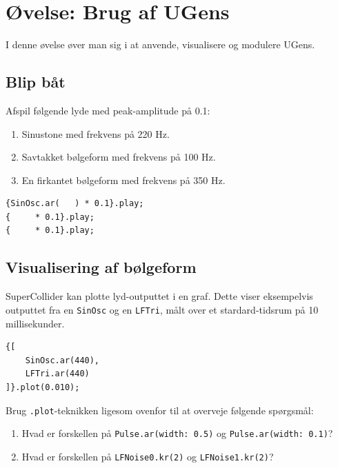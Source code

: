 \section{Øvelse: Brug af UGens}

I denne øvelse øver man sig i at anvende, visualisere og modulere UGens.
\subsection{Blip båt}

Afspil følgende lyde med peak-amplitude på 0.1:

            \begin{enumerate}
            \item Sinustone med frekvens på 220 Hz.
\item Savtakket bølgeform med frekvens på 100 Hz.
\item En firkantet bølgeform med frekvens på 350 Hz. 
            \end{enumerate}

\begin{listing}[H]
\begin{verbatim}
{SinOsc.ar(   ) * 0.1}.play;
{     * 0.1}.play;
{     * 0.1}.play;
\end{verbatim}
\caption{Oscillatorfrekvenser}
\end{listing}
\subsection{Visualisering af bølgeform}

SuperCollider kan plotte lyd-outputtet i en graf. Dette viser eksempelvis outputtet fra en \texttt{SinOsc} og en \texttt{LFTri}, målt over et stardard-tidsrum på 10 millisekunder.

\begin{listing}[H]
\begin{verbatim}
{[
    SinOsc.ar(440),
    LFTri.ar(440)
]}.plot(0.010);
\end{verbatim}
\caption{Visualisering af bølgeform}
\end{listing}

Brug \texttt{{}.plot}-teknikken ligesom ovenfor til at overveje følgende spørgsmål:

            \begin{enumerate}
            \item Hvad er forskellen på \texttt{Pulse.ar(width: 0.5)} og \texttt{Pulse.ar(width: 0.1)}?
\item Hvad er forskellen på \texttt{LFNoise0.kr(2)} og \texttt{LFNoise1.kr(2)}? 
            \end{enumerate}


